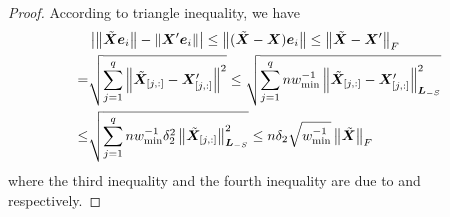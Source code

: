 \documentclass[sigconf]{acmart}
\begin{document}
\begin{proof}
    According to triangle inequality, we have
    \begin{align*}
            & \left|\left\Vert\tilde{\boldsymbol{X}}\boldsymbol{e}_i\right\Vert-\left\Vert\boldsymbol{X}'\boldsymbol{e}_i\right\Vert \right|\le\left\Vert(\tilde{\boldsymbol{X}}-\boldsymbol{X})\boldsymbol{e}_i\right\Vert\le\left\Vert\tilde{\boldsymbol{X}}-\boldsymbol{X}'\right\Vert_{F}                                  \\
        =   & \sqrt{\sum_{j=1}^q\left\Vert\tilde{\boldsymbol{X}}_{[j,:]}-\boldsymbol{X}'_{[j,:]}\right\Vert^2}\le\sqrt{\sum_{j=1}^qnw_{\min}^{-1}\left\Vert\tilde{\boldsymbol{X}}_{[j,:]}-\boldsymbol{X}'_{[j,:]}\right\Vert_{\boldsymbol{L}_{-S}}^2} \\
        \le & \sqrt{\sum_{j=1}^qnw_{\min}^{-1}\delta_2^2\left\Vert\tilde{\boldsymbol{X}}_{[j,:]}\right\Vert_{\boldsymbol{L}_{-S}}^2}\le n\delta_2\sqrt{w_{\min}^{-1}}\left\Vert\tilde{\boldsymbol{X}}\right\Vert_F
    \end{align*}
    where the third inequality and the fourth inequality are due to  and  respectively.


\end{proof}
\end{document}
